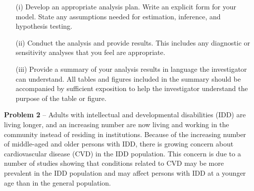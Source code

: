 \begin{itemize}
													\begin{itemize}
													\vspace{0.2cm}
													\item[(i)] Develop an appropriate analysis plan. Write an explicit form for your model.
																		 State any assumptions needed for estimation, inference, and hypothesis testing.
	
													\vspace{0.2cm}
												  \item[(ii)] Conduct the analysis and provide results.	This includes any diagnostic or sensitivity analyses
																			that you feel are appropriate.
													
													\vspace{0.2cm}
												  \item[(iii)] Provide a summary of your analysis results in language the investigator can understand. All tables 
																			 and figures included in the summary should be accompanied by sufficient exposition to help the 
																			 investigator understand the purpose of the table or figure. 		
											   \end{itemize}								

   \end{itemize}	
				
\newpage


	\noindent \textbf{Problem 2} -- Adults with intellectual and developmental disabilities (IDD) are living longer, and an
																	increasing number are now living and working in the community instead of residing in
																	institutions. Because of the increasing number of middle-aged and older persons with IDD,
																	there is growing concern about cardiovascular disease (CVD) in the IDD population. This
																	concern is due to a number of studies showing that conditions related to CVD may be
																	more prevalent in the IDD population and may affect persons with IDD at a younger age
																	than in the general population. \\
																	
